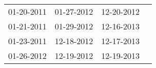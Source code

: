 \begin{supertabular}{llll}
 01-20-2011 &  01-27-2012 &  12-20-2012 \\
 01-21-2011 &  01-29-2012 &  12-16-2013 \\
 01-23-2011 &  12-18-2012 &  12-17-2013 \\
 01-26-2012 &  12-19-2012 &  12-19-2013 \\
\end{supertabular}
